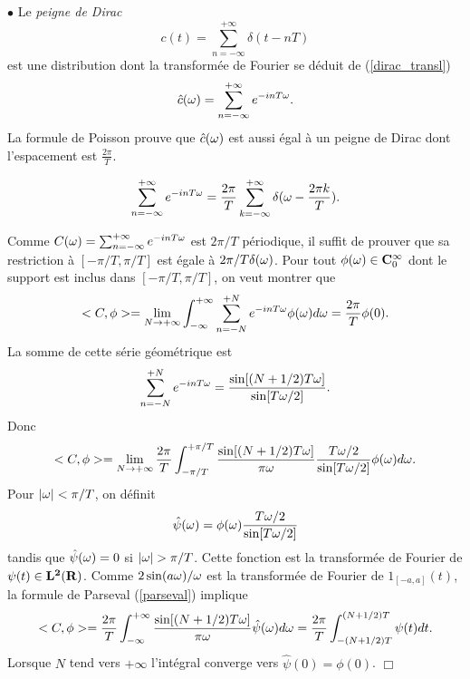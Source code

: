 $\bullet$ Le {\it peigne de Dirac}
\begin{equation}
\label{peigne}
c(t) = \sum_{n=-\infty}^{+ \infty} \delta (t -nT)
\end{equation}
est une distribution 
dont la transform\'ee de Fourier se d\'eduit de (\ref{dirac_transl})
\begin{equation}
\hat c( {\omega}) = \sum_{n=-\infty}^{+ \infty} e^{-inT {\omega}}.
\end{equation}
La formule de Poisson prouve que $\hat c ({\omega})$ est
aussi \'egal \`a un peigne de Dirac dont l'espacement est
$\frac{2 \pi} T$.

\begin{theorem}
\label{poisson-lemma}
\begin{equation}
\label{poisson}
\sum_{n=-\infty}^{+ \infty} e^{-inT {\omega}} =
\frac {2 \pi} T \sum_{k=-\infty}^{+\infty}
\delta({\omega} - \frac {2\pi k} T) .
\end{equation}
\end{theorem}


Comme $C({\omega}) = \sum_{n=-\infty}^{+ \infty} e^{-inT {\omega}}$ est
${2 \pi} / T$ p\'eriodique, il suffit de prouver que sa
restriction \`a $[-\pi/T,\pi/T]$ est \'egale \`a
${2 \pi}/ T \delta ({\omega})$.
Pour tout
$\phi ({\omega}) \in {\bf C}^\infty_0$ dont le support est inclus dans
$[-\pi/T,\pi/T]$, on veut montrer que
\begin{equation}
\label{converge}
<C , \phi> = 
\lim_{N \rightarrow + \infty} \int_{-\infty}^{+\infty}
\sum_{n=-N}^{+ N} e^{-inT {\omega}}
\phi({\omega}) d{\omega} = 
\frac {2\pi} T \phi(0) .
\end{equation}
La somme de cette s\'erie g\'eom\'etrique est
\begin{equation}
\label{geom-sum}
\sum_{n=-N}^{+N} e^{-inT{\omega}} = 
\frac {\sin [(N+1/2)T{\omega}]} {\sin[T{\omega}/2]} .
\end{equation}
Donc
\begin{equation}
<C , \phi> = \lim_{N \rightarrow + \infty} 
\frac {2 \pi} T 
\int_{-\pi/T}^{+\pi/T} \frac {\sin [(N+1/2)T{\omega}]} {\pi {\omega}} 
\frac {T{\omega}/2} {\sin[T{\omega}/2]} \phi({\omega}) d{\omega} .
\end{equation}
Pour $|{\omega}| < \pi/T$, on d\'efinit
\[
\hat \psi ({\omega}) = {\phi({\omega})}  \frac {T{\omega}/2} {\sin[T{\omega}/2]} 
\]
tandis que $\hat \psi ({\omega}) = 0$ si $|{\omega}| > \pi /T$.
Cette fonction est la transform\'ee de Fourier de
$\psi (t) \in {\bf L ^ 2 ({\bf{R}})}$.
Comme ${2 \sin (a {\omega})}/{{\omega}}$ est la transform\'ee de Fourier de
$1_{[-a,a]}(t)$, la formule de Parseval 
(\ref{parseval}) implique
\begin{equation}
<C , \phi> = 
\frac {2 \pi} T 
\int_{-\infty}^{+\infty} \frac {\sin [(N+1/2)T {\omega}]}{\pi {\omega}} 
\hat \psi ({\omega}) d{\omega} = \frac {2 \pi} T 
\int_{-(N+1/2)T}^{(N+1/2)T} \psi(t) dt .
\end{equation}
Lorsque $N$ tend vers $+ \infty$ l'int\'egral converge vers
$\hat \psi(0) = \phi(0)$. $\Box$\\


